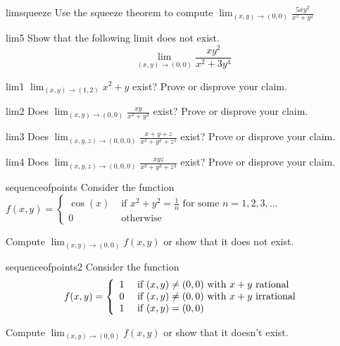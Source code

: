 \begin{problem}{limsqueeze}
Use the squeeze theorem to compute $\lim_{(x,y) \to (0,0)} \frac{5xy^2}{x^2+y^2}$
\end{problem}

\begin{problem}{lim5}
Show that the following limit does not exist.
     $$\lim_{(x,y) \to (0,0)} \frac{xy^2}{x^2 + 3y^4}$$
\end{problem}

\begin{problem}{lim1}
$\lim_{(x,y) \to (1,2)} x^2+y$ exist? Prove or disprove your claim.
\end{problem}

\begin{problem}{lim2}
Does $\lim_{(x,y) \to (0,0)} \frac{xy}{x^2 + y^2}$ exist? Prove or disprove your claim.
\end{problem}

\begin{problem}{lim3}
Does $\lim_{(x,y,z) \to (0,0,0)} \frac{x + y+ z}{x^2 + y^2 +z^2}$ exist? Prove or disprove your claim.
\end{problem}

\begin{problem}{lim4}
Does $\lim_{(x,y,z) \to (0,0,0)} \frac{xyz}{x^3 + y^3 +z^3}$ exist? Prove or disprove your claim.
\end{problem}

\begin{problem}{sequenceofpoints}
Consider the function $f(x,y) = \left\{
		\begin{array}{ll}
			\cos(x) & \text{ if } x^2 + y^2 = \frac{1}{n} \text{ for some } n = 1, 2, 3, \dots \\
			0 & \text{ otherwise } 
		\end{array}
		\right.$
		
		Compute $\lim_{(x,y) \to (0,0)} f(x,y)$ or show that it does not exist.	
\end{problem}

\begin{problem}{sequenceofpoints2}
    Consider the function $$f(x,y) = \left\{
		\begin{array}{ll}
			1 & \text{ if } (x,y) \neq (0,0) \textnormal{ with } x+y \textnormal{ rational} \\
			0 & \text{ if } (x,y) \neq (0,0) \textnormal{ with } x+y \textnormal{ irrational} \\
			1 & \text{ if } (x,y) = (0,0)
		\end{array}
		\right.$$
		
		Compute $\lim_{(x,y) \to (0,0)} f(x,y)$ or show that it doesn't exist.
\end{problem}

